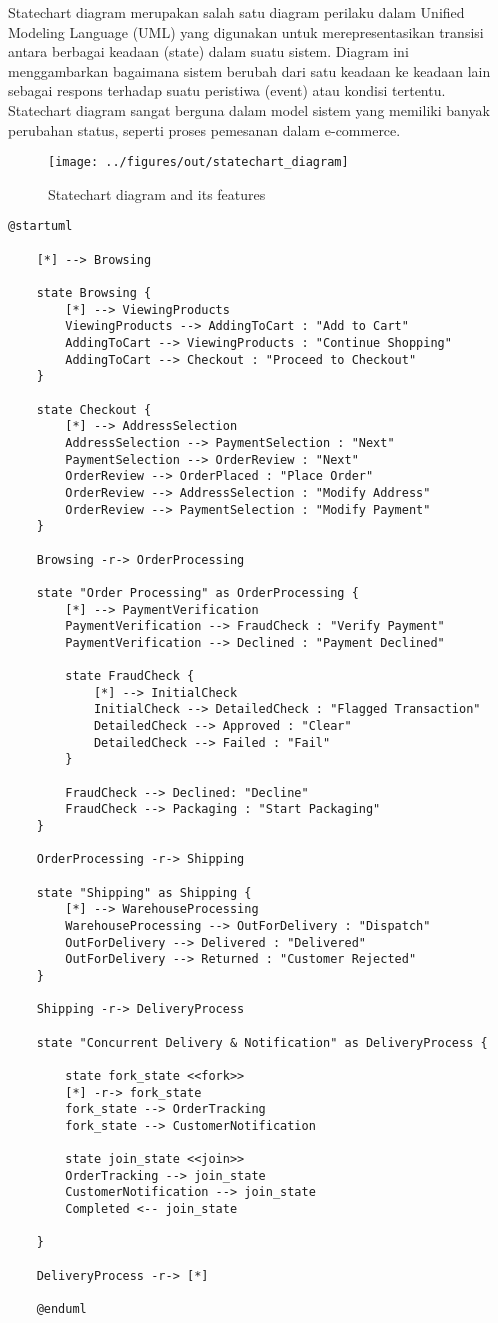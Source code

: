 Statechart diagram merupakan salah satu diagram perilaku dalam Unified Modeling Language (UML) yang digunakan untuk merepresentasikan transisi antara berbagai keadaan (state) dalam suatu sistem. Diagram ini menggambarkan bagaimana sistem berubah dari satu keadaan ke keadaan lain sebagai respons terhadap suatu peristiwa (event) atau kondisi tertentu. Statechart diagram sangat berguna dalam model sistem yang memiliki banyak perubahan status, seperti proses pemesanan dalam e-commerce.

\begin{figure}
	\centering
	\texttt{[image: ../figures/out/statechart\_diagram]}
	\caption{Statechart diagram and its features}
	\label{fig:statechart_diagram}
\end{figure}

\begin{lstlisting}[language=puml, caption={Statechart Diagram for E-Commerce Order Processing}]
	@startuml
	
	[*] --> Browsing
	
	state Browsing {
		[*] --> ViewingProducts
		ViewingProducts --> AddingToCart : "Add to Cart"
		AddingToCart --> ViewingProducts : "Continue Shopping"
		AddingToCart --> Checkout : "Proceed to Checkout"
	}
	
	state Checkout {
		[*] --> AddressSelection
		AddressSelection --> PaymentSelection : "Next"
		PaymentSelection --> OrderReview : "Next"
		OrderReview --> OrderPlaced : "Place Order"
		OrderReview --> AddressSelection : "Modify Address"
		OrderReview --> PaymentSelection : "Modify Payment"
	}
	
	Browsing -r-> OrderProcessing
	
	state "Order Processing" as OrderProcessing {
		[*] --> PaymentVerification
		PaymentVerification --> FraudCheck : "Verify Payment"
		PaymentVerification --> Declined : "Payment Declined"
		
		state FraudCheck {
			[*] --> InitialCheck
			InitialCheck --> DetailedCheck : "Flagged Transaction"
			DetailedCheck --> Approved : "Clear"
			DetailedCheck --> Failed : "Fail"
		}
		
		FraudCheck --> Declined: "Decline"
		FraudCheck --> Packaging : "Start Packaging"
	}
	
	OrderProcessing -r-> Shipping
	
	state "Shipping" as Shipping {
		[*] --> WarehouseProcessing
		WarehouseProcessing --> OutForDelivery : "Dispatch"
		OutForDelivery --> Delivered : "Delivered"
		OutForDelivery --> Returned : "Customer Rejected"
	}
	
	Shipping -r-> DeliveryProcess
	
	state "Concurrent Delivery & Notification" as DeliveryProcess {
		
		state fork_state <<fork>>
		[*] -r-> fork_state 
		fork_state --> OrderTracking
		fork_state --> CustomerNotification
		
		state join_state <<join>>
		OrderTracking --> join_state
		CustomerNotification --> join_state
		Completed <-- join_state
		
	}
	
	DeliveryProcess -r-> [*]
	
	@enduml
\end{lstlisting}


